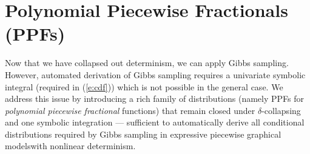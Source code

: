 \documentclass{article} %
\begin{document}
\section{Polynomial Piecewise Fractionals 
(PPFs)}
\label{sect:ppfs}
Now that we have collapsed out determinism, we can apply Gibbs sampling. However, automated derivation of Gibbs sampling requires a univariate symbolic integral (required in (\ref{e:cdf})) which is not possible in the general case.
We address this issue by introducing a rich family of distributions (namely PPFs for \emph{polynomial piecewise fractional} functions) that remain closed under $\delta$-collapsing and one symbolic integration --- sufficient to automatically derive all conditional distributions required by Gibbs sampling in expressive piecewise graphical modelswith nonlinear determinism.  
\end{document}
